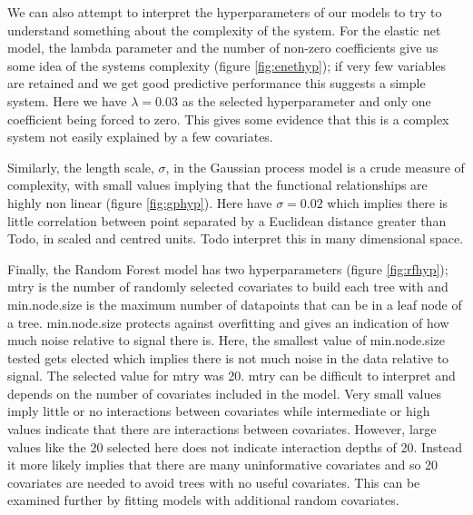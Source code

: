\documentclass[10pt,]{article}
\begin{document}


We can also attempt to interpret the hyperparameters of our models to try to understand something about the complexity of the system. For the elastic net model, the lambda parameter and the number of non-zero coefficients give us some idea of the systems complexity (figure \ref{fig:enethyp}); if very few variables are retained and we get good predictive performance this suggests a simple system. Here we have \(\lambda = 0.03\) as the selected hyperparameter and only one coefficient being forced to zero. This gives some evidence that this is a complex system not easily explained by a few covariates.

Similarly, the length scale, \(\sigma\), in the Gaussian process model is a crude measure of complexity, with small values implying that the functional relationships are highly non linear (figure \ref{fig:gphyp}). Here have \(\sigma = 0.02\) which implies there is little correlation between point separated by a Euclidean distance greater than Todo, in scaled and centred units. Todo interpret this in many dimensional space.

Finally, the Random Forest model has two hyperparameters (figure \ref{fig:rfhyp}); mtry is the number of randomly selected covariates to build each tree with and min.node.size is the maximum number of datapoints that can be in a leaf node of a tree. min.node.size protects against overfitting and gives an indication of how much noise relative to signal there is. Here, the smallest value of min.node.size tested gets elected which implies there is not much noise in the data relative to signal. The selected value for mtry was 20. mtry can be difficult to interpret and depends on the number of covariates included in the model. Very small values imply little or no interactions between covariates while intermediate or high values indicate that there are interactions between covariates. However, large values like the 20 selected here does not indicate interaction depths of 20. Instead it more likely implies that there are many uninformative covariates and so 20 covariates are needed to avoid trees with no useful covariates. This can be examined further by fitting models with additional random covariates.
\end{document}
